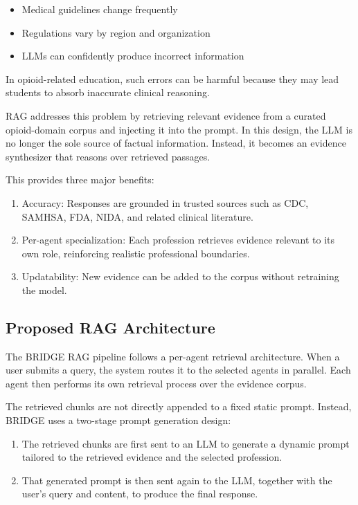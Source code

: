 \documentclass[12pt]{article}
\begin{document}
\begin{itemize}[leftmargin=1.5em]
    \item Medical guidelines change frequently
    \item Regulations vary by region and organization
    \item LLMs can confidently produce incorrect information
\end{itemize}

In opioid-related education, such errors can be harmful because they may lead students to absorb inaccurate clinical reasoning.

RAG addresses this problem by retrieving relevant evidence from a curated opioid-domain corpus and injecting it into the prompt. In this design, the LLM is no longer the sole source of factual information. Instead, it becomes an evidence synthesizer that reasons over retrieved passages.

This provides three major benefits:

\begin{enumerate}[leftmargin=1.5em]
    \item Accuracy: Responses are grounded in trusted sources such as CDC, SAMHSA, FDA, NIDA, and related clinical literature.
    \item Per-agent specialization: Each profession retrieves evidence relevant to its own role, reinforcing realistic professional boundaries.
    \item Updatability: New evidence can be added to the corpus without retraining the model.
\end{enumerate}

\subsection{Proposed RAG Architecture}

The BRIDGE RAG pipeline follows a per-agent retrieval architecture. When a user submits a query, the system routes it to the selected agents in parallel. Each agent then performs its own retrieval process over the evidence corpus.

The retrieved chunks are not directly appended to a fixed static prompt. Instead, BRIDGE uses a two-stage prompt generation design:

\begin{enumerate}[leftmargin=1.5em]
    \item The retrieved chunks are first sent to an LLM to generate a dynamic prompt tailored to the retrieved evidence and the selected profession.
    \item That generated prompt is then sent again to the LLM, together with the user's query and content, to produce the final response.
\end{enumerate}
\end{document}

